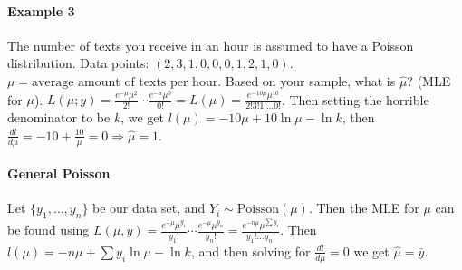 \documentclass[10pt,letter]{article}
\theoremstyle{plain}
\theoremstyle{definition}
\begin{document}
\paragraph{Example 3}
The number of texts you receive in an hour is assumed to have a Poisson distribution. Data points: $(2,3,1,0,0,0,1,2,1,0)$. $\mu=\text{average amount of texts per hour}$. Based on your sample, what is $\hat{\mu}$? (MLE for $\mu$). $L(\mu;y)=\frac{e^{-\mu}\mu^2}{2!}\cdots\frac{e^{-u}\mu^0}{0!}=L(\mu)=\frac{e^{-10\mu}\mu^{10}}{2!3!1!\ldots0!}$. Then setting the horrible denominator to be $k$, we get $l(\mu)=-10\mu+10\ln\mu-\ln k$, then $\frac{dl}{d\mu}=-10+\frac{10}{\mu}=0\Rightarrow \hat{\mu}=1$. 
\paragraph{General Poisson}
Let $\{y_1,\ldots,y_n\}$ be our data set, and $Y_i\sim \text{Poisson}(\mu)$. Then the MLE for $\mu$ can be found using $L(\mu,y)=\frac{e^{-\mu}\mu^{y_1}}{y_1!}\cdots\frac{e^{-\mu}\mu^{y_n}}{y_n!}=\frac{e^{-n\mu}\mu^{\sum y_i}}{y_1!\ldots y_n!}$. Then $l(\mu)=-n\mu+\sum y_i\ln\mu-\ln k$, and then solving for $\frac{dl}{d\mu}=0$ we get $\hat{\mu}=\bar{y}$. 
\end{document}
